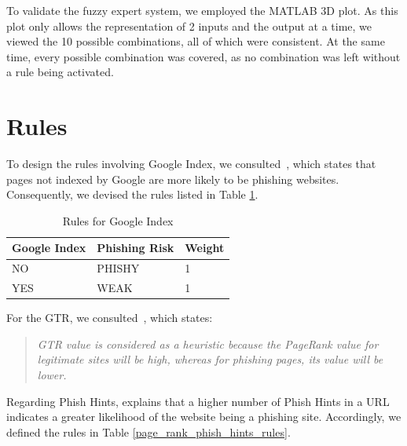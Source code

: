 \documentclass[11pt]{article}
\begin{document}
To validate the fuzzy expert system, we employed the MATLAB 3D plot. As this plot only allows the representation of 2 inputs and the output at a time, we viewed the 10 possible combinations, all of which were consistent. At the same time, every possible combination was covered, as no combination was left without a rule being activated.

\section{Rules}

To design the rules involving Google Index, we consulted~\cite{mainpaper}, which states that pages not indexed by Google are more likely to be phishing websites. Consequently, we devised the rules listed in Table \ref{google_index_rules}.

\begin{table}[H]
    \centering
    \begin{tabular}{|l|l|l|}
        \hline
        \textbf{Google Index} & \textbf{Phishing Risk} & \textbf{Weight} \\ \hline
        NO                    & PHISHY                 & 1               \\ \hline
        YES                   & WEAK                   & 1               \\ \hline
    \end{tabular}
    \caption{Rules for Google Index}
    \label{google_index_rules}
\end{table}

For the GTR, we consulted~\cite{GTR}, which states:

\begin{quote}
    \textit{GTR value is considered as a heuristic because the PageRank value for legitimate sites will be high, whereas for phishing pages, its value will be lower.}
\end{quote}

Regarding Phish Hints, \cite{mainpaper} explains that a higher number of Phish Hints in a URL indicates a greater likelihood of the website being a phishing site. Accordingly, we defined the rules in Table \ref{page_rank_phish_hints_rules}.
\end{document}
